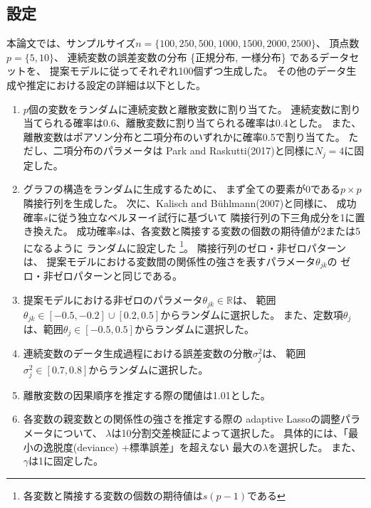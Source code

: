 
\subsection{設定}

本論文では、サンプルサイズ$n = \{ 100, 250, 500, 1000, 1500, 2000, 2500 \}$、
頂点数$p = \{ 5, 10 \}$、
連続変数の誤差変数の分布 \{正規分布, 一様分布\} であるデータセットを、
提案モデルに従ってそれぞれ100個ずつ生成した。
その他のデータ生成や推定における設定の詳細は以下とした。

\begin{enumerate}
  \setlength{\itemsep}{0.3cm}
  \item
  $p$個の変数をランダムに連続変数と離散変数に割り当てた。
  連続変数に割り当てられる確率は0.6、離散変数に割り当てられる確率は0.4とした。
  また、離散変数はポアソン分布と二項分布のいずれかに確率0.5で割り当てた。
  ただし、二項分布のパラメータは
  Park and Raskutti(2017)\cite{Park2017-hw}と同様に$N_j=4$に固定した。

  \item
  グラフの構造をランダムに生成するために、
  まず全ての要素が0である$p\times p$隣接行列を生成した。
  次に、Kalisch and B\"{u}hlmann(2007)\cite{Kalisch2007-xg}と同様に、
  成功確率$s$に従う独立なベルヌーイ試行に基づいて
  隣接行列の下三角成分を1に置き換えた。
  成功確率$s$は、各変数と隣接する変数の個数の期待値が2または5になるように
  ランダムに設定した
  \footnote{各変数と隣接する変数の個数の期待値は$s(p-1)$である\cite{Kalisch2007-xg}}。
  隣接行列のゼロ・非ゼロパターンは、
  提案モデルにおける変数間の関係性の強さを表すパラメータ$\theta_{jk}$の
  ゼロ・非ゼロパターンと同じである。

  \item
  提案モデルにおける非ゼロのパラメータ$\theta_{jk} \in \mathbb R$は、
  範囲$\theta_{jk} \in [-0.5,-0.2]\cup [0.2,0.5]$からランダムに選択した。
  また、定数項$\theta_j$は、範囲$\theta_j \in [-0.5,0.5]$からランダムに選択した。

  \item
  連続変数のデータ生成過程における誤差変数の分散$\sigma_j^2$は、
  範囲$\sigma_j^2 \in [0.7,0.8]$からランダムに選択した。

  \item
  離散変数の因果順序を推定する際の閾値は1.01とした。

  \item
  各変数の親変数との関係性の強さを推定する際の
  adaptive Lassoの調整パラメータについて、
  $\lambda$は10分割交差検証によって選択した。
  具体的には、「最小の逸脱度(deviance) +標準誤差」を超えない
  最大の$\lambda$を選択した。
  また、$\gamma$は1に固定した。
\end{enumerate}

